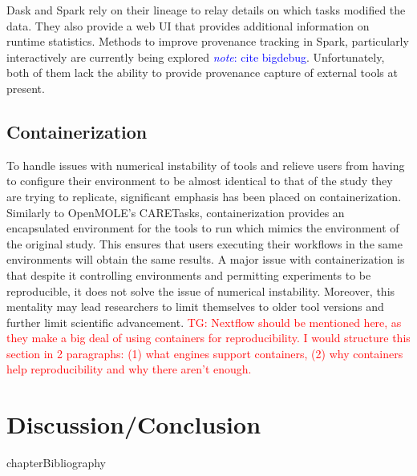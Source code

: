 \documentclass{report}
\newcommand{\note}[1]{\textcolor{blue}{\textit{note}: #1}}
\newcommand{\tristan}[1]{\textcolor{red}{TG: #1}}
\begin{document}
            Dask and Spark rely on their lineage to relay details on which 
            tasks modified the data. They also provide a web UI that provides
            additional information on runtime statistics. Methods to improve 
            provenance tracking in Spark, particularly interactively are 
            currently being explored \note{cite bigdebug}. Unfortunately, both
            of them lack the ability to provide provenance capture of external
            tools at present.

        \section{Containerization}\label{repcont}

            To handle issues with numerical instability of tools and relieve 
            users from
            having to configure their environment to be almost identical to 
            that of the study they are trying to replicate, significant 
            emphasis has been placed on containerization. Similarly to 
            OpenMOLE's CARETasks, containerization provides an encapsulated
            environment for the tools to run which mimics the environment of 
            the original study. This ensures that users executing their 
            workflows in the same environments will obtain the same results.
            A major issue with containerization is that despite it controlling
            environments and permitting experiments to be reproducible, it does
            not solve the issue of numerical instability. Moreover, this 
            mentality may lead researchers to limit themselves to older tool 
            versions and further limit scientific advancement.
            \tristan{Nextflow should be mentioned here, as they make a big deal
            of using containers for reproducibility. I would structure this section in 
            2 paragraphs: (1) what engines support containers, (2) why containers help
            reproducibility and why there aren't enough.}
    
    
    \chapter{Discussion/Conclusion}


        {chapter}{Bibliography} 
        
        
\end{document}
